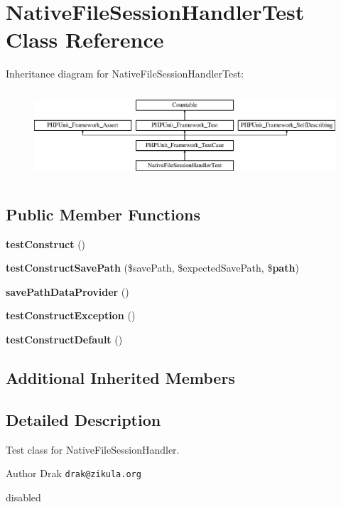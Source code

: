 \section{Native\+File\+Session\+Handler\+Test Class Reference}
\label{class_symfony_1_1_component_1_1_http_foundation_1_1_tests_1_1_session_1_1_storage_1_1_handler_1_7f1db1e5d339ad489e71d2ccd3baf29a}
Inheritance diagram for Native\+File\+Session\+Handler\+Test\+:\begin{figure}[H]
\begin{center}
\leavevmode
\includegraphics[height=3.303835cm]{class_symfony_1_1_component_1_1_http_foundation_1_1_tests_1_1_session_1_1_storage_1_1_handler_1_7f1db1e5d339ad489e71d2ccd3baf29a}
\end{center}
\end{figure}
\subsection*{Public Member Functions}
\begin{DoxyCompactItemize}
\item 
{\bf test\+Construct} ()
\item 
{\bf test\+Construct\+Save\+Path} (\$save\+Path, \$expected\+Save\+Path, \${\bf path})
\item 
{\bf save\+Path\+Data\+Provider} ()
\item 
{\bf test\+Construct\+Exception} ()
\item 
{\bf test\+Construct\+Default} ()
\end{DoxyCompactItemize}
\subsection*{Additional Inherited Members}


\subsection{Detailed Description}
Test class for Native\+File\+Session\+Handler.

\begin{DoxyAuthor}{Author}
Drak {\tt drak@zikula.\+org}
\end{DoxyAuthor}
disabled 

